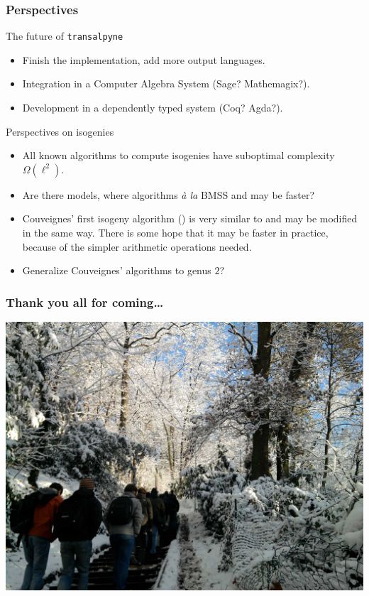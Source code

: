 \documentclass[10pt,usepdftitle=false]{beamer}
\begin{document}
\begin{frame}
  \frametitle{Perspectives}

  \begin{block}{The future of \texttt{transalpyne}}
    \begin{itemize}
    \item Finish the implementation, add more output languages.
    \item Integration in a Computer Algebra System (Sage?
      Mathemagix?).
    \item Development in a dependently typed system (Coq? Agda?).
    \end{itemize}
  \end{block}

  \begin{block}{Perspectives on isogenies}
    \begin{itemize}
    \item All known algorithms to compute isogenies have suboptimal
      complexity $\Omega(\ell^2)$.
    \item Are there models, where algorithms \textit{à la} BMSS and
      \cite{lercier+sirvent08} may be faster?
    \item Couveignes' first isogeny algorithm (\cite{couveignes94}) is
      very similar to \cite{couveignes96} and may be modified in the
      same way. There is some hope that it may be faster in practice,
      because of the simpler arithmetic operations needed.
    \item Generalize Couveignes' algorithms to genus $2$?
    \end{itemize}
  \end{block}
\end{frame}


\addtocounter{framenumber}{-1}
\begin{frame}[plain]
  \frametitle{Thank you all for coming\dots}
  \includegraphics[width=\textwidth]{marcheneige.jpg}
\end{frame}
\end{document}
